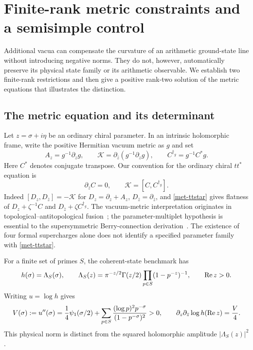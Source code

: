 \section{Finite-rank metric constraints and a semisimple control}
\label{met-section}

Additional vacua can compensate the curvature of an arithmetic ground-state
line without introducing negative norms.  They do not, however, automatically
preserve its physical state family or its arithmetic observable.  We establish
two finite-rank restrictions and then give a positive rank-two solution of the
metric equations that illustrates the distinction.

\subsection{The metric equation and its determinant}
\label{met-conventions}

Let $z=\sigma+i\eta$ be an ordinary chiral parameter.  In an intrinsic
holomorphic frame, write the positive Hermitian vacuum metric as $g$ and set
\begin{equation}
 A_z=g^{-1}\partial_zg,\qquad
 \mathcal K=\partial_{\bar z}(g^{-1}\partial_zg),\qquad
 C^{\dagger_g}=g^{-1}C^*g.
 \label{met-connection}
\end{equation}
Here $C^*$ denotes conjugate transpose.  Our convention for the ordinary
chiral $tt^*$ equation is
\begin{equation}
 \partial_{\bar z}C=0,\qquad
 \mathcal K=[C,C^{\dagger_g}].
 \label{met-ttstar}
\end{equation}
Indeed $[D_z,D_{\bar z}]=-\mathcal K$ for
$D_z=\partial_z+A_z$, $D_{\bar z}=\partial_{\bar z}$, and
\eqref{met-ttstar} gives flatness of
$D_z+\zeta^{-1}C$ and $D_{\bar z}+\zeta C^{\dagger_g}$.
The vacuum-metric interpretation originates in topological--antitopological
fusion~\cite{CecottiVafa}; the parameter-multiplet hypothesis is essential to
the supersymmetric Berry-connection derivation~\cite{SonnerTong}.
The existence of four formal supercharges alone does not identify a specified
parameter family with \eqref{met-ttstar}.

For a finite set of primes $S$, the coherent-state benchmark has
\begin{equation}
 h(\sigma)=\Lambda_S(\sigma),\qquad
 \Lambda_S(z)=\pi^{-z/2}\Gamma(z/2)
       \prod_{p\in S}(1-p^{-z})^{-1},\qquad \operatorname{Re} z>0.
 \label{met-arithmetic-metric}
\end{equation}
Writing $u=\log h$ gives
\begin{equation}
 V(\sigma):=u''(\sigma)
 =\frac14\psi_1(\sigma/2)
  +\sum_{p\in S}\frac{(\log p)^2p^{-\sigma}}
                         {(1-p^{-\sigma})^2}>0,
 \qquad
 \partial_z\partial_{\bar z}\log h(\operatorname{Re} z)=\frac V4.
 \label{met-variance}
\end{equation}
This physical norm is distinct from the squared holomorphic amplitude
$|\Lambda_S(z)|^2$.

